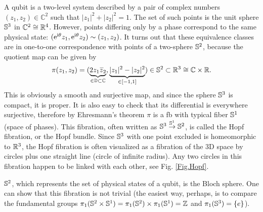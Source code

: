 \begin{example}\label{Hopf bundle}
    A qubit is a two-level system described by a pair of complex numbers $(z_1,z_2)\in\mathbb{C}^2$ such that $|z_1|^2+|z_2|^2=1$. The set of such points is the unit sphere $\mathbb{S}^3$ in $\mathbb{C}^2\cong\mathbb{R}^4$. However, points differing only by a phase correspond to the same physical state: $(\mathrm{e}^{\mathrm{i}\theta}z_1,\mathrm{e}^{\mathrm{i}\theta}z_2)\sim(z_1,z_2)$. It turns out that these equivalence classes are in one-to-one correspondence with points of a two-sphere $\mathbb{S}^2$, because the quotient map can be given by
    \[\pi(z_1,z_2)=(\underbrace{2z_1\wb{z}_2}_{\in \mathbb{D}\subset\mathbb{C}},\underbrace{|z_1|^2-|z_2|^2}_{\in [-1,1]})\in \bbS^2\subset\bbR^3\cong \mathbb{C}\times\bbR.\]
    This is obviously a smooth and surjective map, and since the sphere $\mathbb{S}^3$ is compact, it is proper. It is also easy to check that its differential is everywhere surjective, therefore by Ehresmann's theorem $\pi$ is a \gls{fb} with typical fiber $\mathbb{S}^1$ (space of phases). This fibration, often written as $\mathbb{S}^3\overset{\mathbb{S}^1}{\to}\mathbb{S}^2$, is called the Hopf fibration, or the Hopf bundle. Since $\mathbb{S}^3$ with one point excluded is homeomorphic to $\mathbb{R}^3$, the Hopf fibration is often visualized as a fibration of the 3D space by circles plus one straight line (circle of infinite radius). Any two circles in this fibration happen to be linked with each other, see Fig. \ref{Fig.Hopf}.
    
    $\mathbb{S}^2$, which represents the set of physical states of a qubit, is the Bloch sphere. One can show that this fibration is not trivial (the easiest way, perhaps, is to compare the fundamental groups $\pi_1(\mathbb{S}^2\times \mathbb{S}^1)=\pi_1(\mathbb{S}^2)\times\pi_1(\mathbb{S}^1)=\mathbb{Z}$ and $\pi_1(\mathbb{S}^3)=\{e\}$).
    

\end{example}
